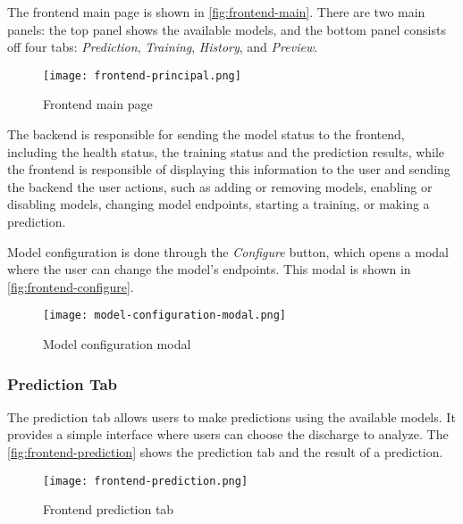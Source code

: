 The frontend main page is shown in \autoref{fig:frontend-main}. There are two main panels: the top panel shows the available models, and the bottom panel consists off four tabs: \textit{Prediction}, \textit{Training}, \textit{History}, and \textit{Preview}.

\begin{figure}[H]
    \centering
    \texttt{[image: frontend-principal.png]}
    \caption{Frontend main page}
    \label{fig:frontend-main}
\end{figure}

The backend is responsible for sending the model status to the frontend, including the health status, the training status and the prediction results, while the frontend is responsible of displaying this information to the user and sending the backend the user actions, such as adding or removing models, enabling or disabling models, changing model endpoints, starting a training, or making a prediction.

Model configuration is done through the \textit{Configure} button, which opens a modal where the user can change the model's endpoints. This modal is shown in \autoref{fig:frontend-configure}.

\begin{figure}[H]
    \centering
    \texttt{[image: model-configuration-modal.png]}
    \caption{Model configuration modal}
    \label{fig:frontend-configure}
\end{figure}

\subsubsection{Prediction Tab}

The prediction tab allows users to make predictions using the available models. It provides a simple interface where users can choose the discharge to analyze. The \autoref{fig:frontend-prediction} shows the prediction tab and the result of a prediction.

\begin{figure}[H]
    \centering
    \texttt{[image: frontend-prediction.png]}
    \caption{Frontend prediction tab}
    \label{fig:frontend-prediction}
\end{figure}

